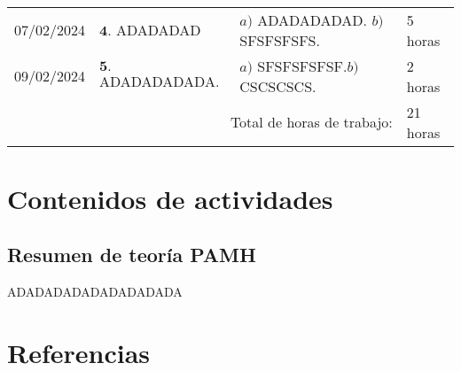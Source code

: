 \documentclass[12pt]{article}
\begin{document}
\hfill\\
\begin{minipage}[h]{\textwidth}
	\centering
	\begin{tabularx}{\textwidth}{|p{2cm}|X|X|p{2cm}|} 
		\hline		
		
	 	07/02/2024 & 
	 	$\mathbf{4}.$ ADADADAD & 
	 	$a)$ ADADADADAD. \newline $b)$ SFSFSFSFS. \newline & 
	 	5 horas \\
	 	09/02/2024 & 
	 	$\mathbf{5}.$ ADADADADADA. & 
	 	$a)$ SFSFSFSFSF.\newline $b)$ CSCSCSCS. \newline & 
	 	2 horas \\
	 	\hline
		\multicolumn{3}{|r|}{Total de horas de trabajo:} & 21 horas \\ 
	 	\hline                 
	\end{tabularx}
\end{minipage}


\section*{Contenidos de actividades}

\subsection*{Resumen de teoría PAMH}

ADADADADADADADADADA
\cite{DataScience}




\newpage

\section*{Referencias}
\renewcommand\refname{}


\end{document}

